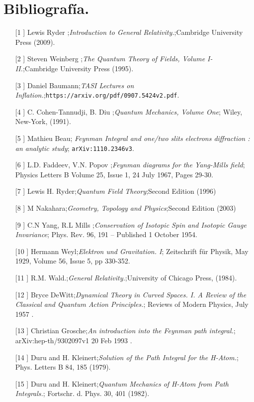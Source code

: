 \chapter*{Bibliografía.}
\begin{itemize}
\item[[1]] Lewis Ryder ;\textit{Introduction to General Relativity.};Cambridge University Press (2009).
\item[[2]] Steven Weinberg ;\textit{The Quantum Theory of Fields, Volume I-II.};Cambridge University Press (1995).
\item[[3]] Daniel Baumann;\textit{TASI Lectures on Inflation.};\texttt{https://arxiv.org/pdf/0907.5424v2.pdf}.
\item[[4]] C. Cohen-Tannudji, B. Diu ;\textit{Quantum Mechanics, Volume One}; Wiley, New-York, (1991).
\item[[5]] Mathieu Beau; \textit{Feynman Integral and one/two slits electrons diffraction : an analytic study}; \texttt{arXiv:1110.2346v3}.
\item[[6]]  L.D. Faddeev,  V.N. Popov ;\textit{Feynman diagrams for the Yang-Mills field}; Physics Letters B Volume 25, Issue 1, 24 July 1967, Pages 29-30.
\item[[7]] Lewis H. Ryder;\textit{Quantum Field Theory};Second Edition (1996) 
\item[[8]] M Nakahara;\textit{Geometry, Topology and Physics};Second Edition (2003) 
\item[[9]]  C.N Yang,  R.L Mills ;\textit{Conservation of Isotopic Spin and Isotopic Gauge Invariance}; Phys. Rev. 96, 191 – Published 1 October 1954.
\item[[10]]  Hermann Weyl;\textit{Elektron und Gravitation. I}; Zeitschrift für Physik, May 1929, Volume 56, Issue 5, pp 330-352.
\item[[11]] R.M. Wald.;\textit{General Relativity.};University of Chicago Press, (1984). 
\item[[12]]  Bryce DeWitt;\textit{Dynamical Theory in Curved Spaces. I. A Review of the Classical and Quantum Action Principles.}; Reviews of Modern Physics, July 1957 .
\item[[13]]  Christian Grosche;\textit{An introduction into the Feynman path integral.}; arXiv:hep-th/9302097v1 20 Feb 1993 .
\item[[14]]   Duru and H. Kleinert;\textit{Solution of the Path Integral for the H-Atom.}; Phys. Letters B 84, 185 (1979).
\item[[15]]   Duru and H. Kleinert;\textit{Quantum Mechanics of H-Atom from Path Integrals.};  Fortschr. d. Phys. 30, 401 (1982).

\end{itemize}
